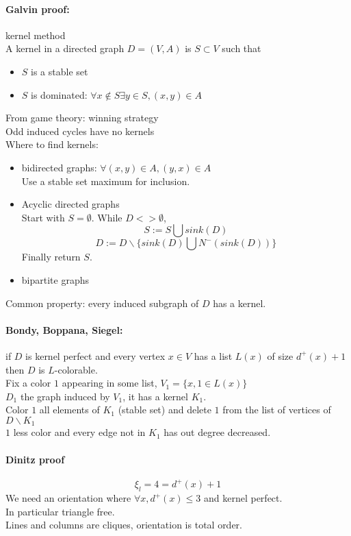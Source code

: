 \documentclass[12pt]{article}
\begin{document}
\paragraph{Galvin proof:} kernel method\\
A kernel in a directed graph $D=(V,A)$ is $S \subset V$ such that
\begin{itemize}
\item $S$ is a stable set
\item $S$ is dominated: $\forall x \notin S \exists y \in S, (x,y) \in A$
\end{itemize}
From game theory: winning strategy\\
Odd induced cycles have no kernels\\
Where to find kernels:
\begin{itemize}
\item bidirected graphs: $\forall (x,y) \in A, (y,x) \in A$\\
	Use a stable set maximum for inclusion.
\item Acyclic directed graphs\\
	Start with $S=\emptyset$. While $D <> \emptyset$,\\
	\[S := S \bigcup sink(D)\]
	\[D := D \backslash \{ sink(D) \bigcup N^- (sink(D)) \} \]
	Finally return $S$.
\item bipartite graphs
\end{itemize}
Common property: every induced subgraph of $D$ has a kernel.\\

\paragraph{Bondy, Boppana, Siegel:} if $D$ is kernel perfect and every vertex $x \in V$ has a list $L(x)$ of size $d^+(x) + 1$ then $D$ is $L$-colorable.\\
Fix a color $1$ appearing in some list, $V_1 = \{ x, 1 \in L(x) \}$\\
$D_1$ the graph induced by $V_1$, it has a kernel $K_1$.\\
Color $1$ all elements of $K_1$ (stable set) and delete $1$ from the list of vertices of $D \backslash K_1$\\
$1$ less color and every edge not in $K_1$ has out degree decreased.

\paragraph{Dinitz proof}
\[ \xi_l = 4 = d^+(x) + 1 \]
We need an orientation where $\forall x, d^+(x) \leqslant 3$ and kernel perfect.\\
In particular triangle free.\\
Lines and columns are cliques, orientation is total order.\\
\end{document}

